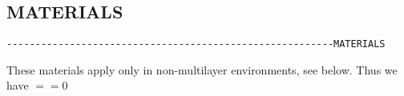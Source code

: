 



\subsection{MATERIALS}
\begin{verbatim}
---------------------------------------------------------MATERIALS
\end{verbatim}

These materials apply only in non-multilayer environments, see below.
Thus we have $==0$

